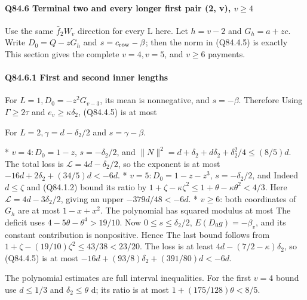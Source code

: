 \paragraph{Q84.6 Terminal two and every longer first pair (2, v), \(v\ge 4\)}

Use the same \(\bar f_2W_v\) direction for every L here. Let \(h=v-2\) and
\(G_h=a+zc\). Write \(D_0=Q-zG_h\) and \(s=c_{\rm row}-\beta\);
then the norm in (Q84.4.5) is exactly
This section gives the complete \(v=4,\allowbreak  v=5\), and \(v\ge 6\) payments.

\paragraph{Q84.6.1 First and second inner lengths}

For \(L=1,\allowbreak  D_0=-z^2G_{v-3}\), its mean is nonnegative,
and \(s=-\beta\). Therefore
Using \(\Gamma\ge2\tau\) and \(e_v\ge\kappa \delta_2\), (Q84.4.5) is at most

For \(L=2,\allowbreak  \gamma=d-\delta_2/2\) and \(s=\gamma-\beta\).

* \(v=4: D_0=1-z\), \(s=-\delta_2/2\), and
  \(\|N\|^2=d+\delta_2+d\delta_2+\delta_2^2/4\le(8/5)d\).
  The total loss is \(\mathcal L=4d-\delta_2/2\), so the exponent is
  at most \(-16d+2\delta_2+(34/5)d<-6d\).
* \(v=5: D_0=1-z-z^3\), \(s=-\delta_2/2\), and
  Indeed \(d\le \zeta\) and (Q84.1.2) bound its ratio by
  \(1+\zeta-\kappa\zeta^2\le1+\theta-\kappa\theta^2<4/3\).
  Here \(\mathcal L=4d-3\delta_2/2\), giving an upper
  \(-379d/48<-6d\).
* \(v\ge 6\): both coordinates of \(G_h\) are at most \(1-x+x^2\).
  The polynomial has squared modulus at most
  The deficit uses \(4-5\theta-\theta^4>19/10\).
  Now \(0\le s\le \delta_2/2\), \(E(D_0g)=-\beta_v\), and its
  constant contribution is nonpositive. Hence
  The last bound follows from
  \(1+\zeta-(19/10)\zeta^2\le43/38<23/20\).
  The loss is at least \(4d-(7/2-\kappa)\delta_2\), so (Q84.4.5) is at most
  \(-16d+(93/8)\delta_2+(391/80)d<-6d\).

The polynomial estimates are full interval inequalities. For the first
\(v=4\) bound use \(d\le 1/3\) and \(\delta_2\le \theta\) d; its ratio is at most
\(1+(175/128)\theta<8/5\).

